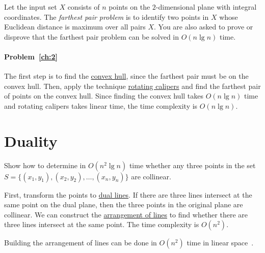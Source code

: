 \begin{Exercise}[title={Farthest pair},origin={NTU CSIE 97}]
Let the input set $X$ consists of $n$ points on the $2$-dimensional plane with integral coordinates. The \emph{farthest pair problem} is to identify two points in $X$ whose Euclidean distance is maximum over all pairs $X$. You are also asked to prove or disprove that the farthest pair problem can be solved in $O(n \lg n)$ time. \label{ch:2}  
\end{Exercise}
\begin{Answer}
\paragraph{Problem~\ref{ch:2}}
The first step is to find the \href{https://en.wikipedia.org/wiki/Convex_hull_algorithms}{convex hull}, since the farthest pair must be on the convex hull. Then, apply the technique \href{https://en.wikipedia.org/wiki/Rotating_calipers}{rotating calipers} and find the farthest pair of points on the convex hull. Since finding the convex hull takes $O(n \lg n)$ time and rotating calipers takes linear time, the time complexity is $O(n \lg n)$.
\end{Answer}

\section{Duality}
\begin{Exercise}
Show how to determine in $O(n^2 \lg n)$ time whether any three points in the set $S = \{(x_1, y_1), (x_2, y_2), \dots, (x_n, y_n)\}$ are collinear. 
\end{Exercise}
\begin{Answer}
First, transform the points to \href{https://en.wikipedia.org/wiki/Duality_(projective_geometry)}{dual lines}. If there are three lines intersect at the same point on the dual plane, then the three points in the original plane are collinear. We can construct the \href{https://en.wikipedia.org/wiki/Arrangement_of_lines}{arrangement of lines} to find whether there are three lines intersect at the same point. The time complexity is $O(n^2)$.
\begin{remark}
Building the arrangement of lines can be done in $O(n^2)$ time in linear space~\cite{Edelsbrunner1989}.
\end{remark}
\end{Answer}

